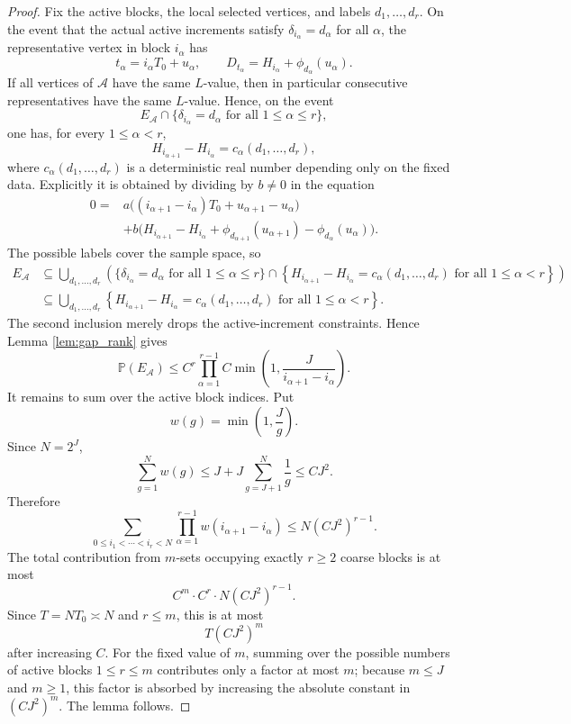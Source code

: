 \documentclass[11pt]{article}
\theoremstyle{definition}
\theoremstyle{remark}
\newcommand{\Pp}{\mathbb P}
\newcommand{\1}{\mathbf 1}
\begin{document}
\begin{proof}
\bigskip
\noindent
Fix the active blocks, the local selected vertices, and labels $d_1,\ldots,d_r$.  On the event that the actual active increments satisfy $\delta_{i_\alpha}=d_\alpha$ for all $\alpha$, the representative vertex in block $i_\alpha$ has
\[
t_\alpha=i_\alpha T_0+u_\alpha,
\qquad
D_{t_\alpha}=H_{i_\alpha}+\phi_{d_\alpha}(u_\alpha).
\]
If all vertices of $\mathcal A$ have the same $L$-value, then in particular consecutive representatives have the same $L$-value.  Hence, on the event
\[
E_\mathcal A\cap
\{\delta_{i_\alpha}=d_\alpha\text{ for all }1\le\alpha\le r\},
\]
one has, for every $1\le\alpha<r$,
\[
H_{i_{\alpha+1}}-H_{i_\alpha}=c_\alpha(d_1,\ldots,d_r),
\]
where $c_\alpha(d_1,\ldots,d_r)$ is a deterministic real number depending only on the fixed data.  Explicitly it is obtained by dividing by $b\ne0$ in the equation
\[
\begin{aligned}
0={}&a\bigl((i_{\alpha+1}-i_\alpha)T_0+u_{\alpha+1}-u_\alpha\bigr)\\
&+b\bigl(H_{i_{\alpha+1}}-H_{i_\alpha}
 +\phi_{d_{\alpha+1}}(u_{\alpha+1})-\phi_{d_\alpha}(u_\alpha)\bigr).
\end{aligned}
\]
The possible labels cover the sample space, so
\[
\begin{aligned}
E_\mathcal A
&\subseteq
\bigcup_{d_1,\ldots,d_r}
\left(
\{\delta_{i_\alpha}=d_\alpha\text{ for all }1\le\alpha\le r\}
\cap
\left\{
H_{i_{\alpha+1}}-H_{i_\alpha}=c_\alpha(d_1,\ldots,d_r)
\text{ for all }1\le\alpha<r
\right\}\right)\\
&\subseteq
\bigcup_{d_1,\ldots,d_r}
\left\{
H_{i_{\alpha+1}}-H_{i_\alpha}=c_\alpha(d_1,\ldots,d_r)
\text{ for all }1\le\alpha<r
\right\}.
\end{aligned}
\]
The second inclusion merely drops the active-increment constraints.  Hence Lemma \ref{lem:gap_rank} gives
\[
\Pp(E_\mathcal A)
\le
C^r
\prod_{\alpha=1}^{r-1}C\min\left(1,\frac{J}{i_{\alpha+1}-i_\alpha}\right).
\]
It remains to sum over the active block indices.  Put
\[
w(g)=\min\left(1,\frac{J}{g}\right).
\]
Since $N=2^J$,
\[
\sum_{g=1}^N w(g)
\le J+J\sum_{g=J+1}^N \frac{1}{g}
\le C J^2.
\]
Therefore
\[
\sum_{0\le i_1<\cdots<i_r<N}
\prod_{\alpha=1}^{r-1}w(i_{\alpha+1}-i_\alpha)
\le
N(CJ^2)^{r-1}.
\]
The total contribution from $m$-sets occupying exactly $r\ge2$ coarse blocks is at most
\[
C^m\cdot C^r\cdot N(CJ^2)^{r-1}.
\]
Since $T=NT_0\asymp N$ and $r\le m$, this is at most
\[
T(CJ^2)^m
\]
after increasing $C$.  For the fixed value of $m$, summing over the possible numbers of active blocks $1\le r\le m$ contributes only a factor at most $m$; because $m\le J$ and $m\ge1$, this factor is absorbed by increasing the absolute constant in $(CJ^2)^m$.  The lemma follows.
\end{proof}
\end{document}
